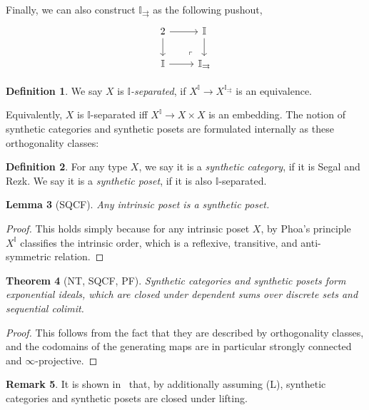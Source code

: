 \documentclass[12pt]{amsart}
\newtheorem{theorem}{Theorem}[section]
\newtheorem{lemma}[theorem]{Lemma}
\theoremstyle{definition}
\newtheorem{definition}[theorem]{Definition}
\newtheorem{remark}[theorem]{Remark}
\newcommand{\mbb}[1]{\mathbb{#1}}
\newcommand{\I}{\mbb I}
\begin{document}
Finally, we can also construct $\I_{\rightrightarrows}$ as the following pushout,
\[
\begin{tikzcd}
  2 \ar[r] \ar[d] & \I \ar[d] \\ 
  \I \ar[r] & \I_{\rightrightarrows}
  \arrow["\lrcorner"{anchor=center, pos=0.125, rotate=180}, draw=none, from=2-2, to=1-1]
\end{tikzcd}
\]

\begin{definition}
  We say $X$ is \emph{$\I$-separated}, if $X^{\I} \to X^{\I_\rightrightarrows}$ is an equivalence.
\end{definition}

Equivalently, $X$ is $\I$-separated iff $X^\I \to X \times X$ is an embedding. The notion of synthetic categories and synthetic posets are formulated internally as these orthogonality classes:

\begin{definition}
  For any type $X$, we say it is a \emph{synthetic category}, if it is Segal and Rezk. We say it is a \emph{synthetic poset}, if it is also $\I$-separated.
\end{definition}

\begin{lemma}[SQCF]
  Any intrinsic poset is a synthetic poset.
\end{lemma}
\begin{proof}
  This holds simply because for any intrinsic poset $X$, by Phoa's principle $X^\I$ classifies the intrinsic order, which is a reflexive, transitive, and anti-symmetric relation.
\end{proof}

\begin{theorem}[NT, SQCF, PF]
  Synthetic categories and synthetic posets form exponential ideals, which are closed under dependent sums over discrete sets and sequential colimit.
\end{theorem}
\begin{proof}
  This follows from the fact that they are described by orthogonality classes, and the codomains of the generating maps are in particular strongly connected and $\infty$-projective.
\end{proof}

\begin{remark}
  It is shown in~\cite{} that, by additionally assuming (L), synthetic categories and synthetic posets are closed under lifting. 
\end{remark}
\end{document}
